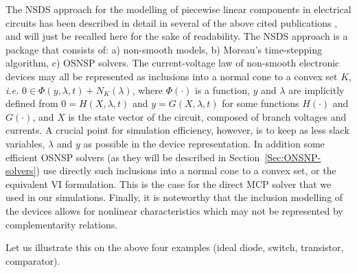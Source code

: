 The NSDS approach for the  modelling of piecewise linear components in electrical circuits has been described in detail  in several of the above cited publications \cite{acary-brogliato2008,glocker2005,moreau1988,jean1999,moreau1999}, and will just be recalled here for the sake of readability. The NSDS approach is a package that consists of: a) non-smooth models, b) Moreau's time-stepping algorithm, c) OSNSP solvers. The current-voltage law of non-smooth electronic devices  may all be represented as inclusions into a normal cone to a convex set $K$, \textit{i.e.} $0 \in \Phi(y,\lambda,t) + N_{K}(\lambda)$, where $\Phi(\cdot)$ is a function, $y$ and $\lambda$ are implicitly defined from $0=H(X,\lambda,t)$ and $y=G(X,\lambda,t)$ for some functions $H(\cdot)$ and $G(\cdot)$, and $X$ is the state vector of the circuit, composed of branch voltages and currents. A crucial point for simulation efficiency, however, is to keep as less slack variables, $\lambda$ and $y$ as possible in the device representation. In addition some efficient OSNSP solvers (as they will be described in Section~\ref{Sec:ONSNP-solvers}) use directly such inclusions into a normal cone to a convex set, or the equivalent VI formulation. This is the case for the direct MCP solver that we used in our simulations. Finally, it is noteworthy that the inclusion modelling of the devices allows for nonlinear characteristics which may not be represented by complementarity relations. 

 Let us illustrate this on the above four examples (ideal diode, switch, transistor, comparator).

